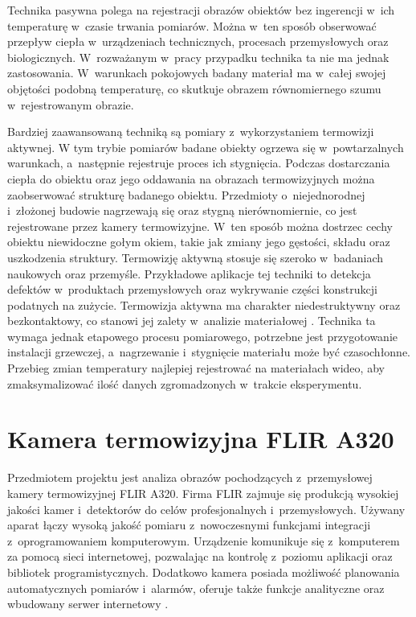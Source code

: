 Technika pasywna polega na rejestracji obrazów obiektów bez ingerencji w~ich
temperaturę w~czasie trwania pomiarów.
Można w~ten sposób obserwować przepływ ciepła w~urządzeniach technicznych,
procesach przemysłowych oraz biologicznych.
W~rozważanym w~pracy przypadku technika ta nie ma jednak zastosowania.
W~warunkach pokojowych badany materiał ma w~całej swojej objętości podobną
temperaturę, co skutkuje obrazem równomiernego szumu w~rejestrowanym obrazie.

Bardziej zaawansowaną techniką są pomiary z~wykorzystaniem termowizji aktywnej.
W tym trybie pomiarów badane obiekty ogrzewa się w~powtarzalnych warunkach,
a~następnie rejestruje proces ich stygnięcia.
Podczas dostarczania ciepła do obiektu oraz jego oddawania na obrazach
termowizyjnych można zaobserwować strukturę badanego obiektu.
Przedmioty o~niejednorodnej i~złożonej budowie nagrzewają się oraz stygną
nierównomiernie, co jest rejestrowane przez kamery termowizyjne.
W~ten sposób można dostrzec cechy obiektu niewidoczne gołym okiem, takie jak 
zmiany jego gęstości, składu oraz uszkodzenia struktury.
Termowizję aktywną stosuje się szeroko w~badaniach naukowych oraz przemyśle.
Przykładowe aplikacje tej techniki to detekcja defektów w~produktach
przemysłowych oraz wykrywanie części konstrukcji podatnych na zużycie.
Termowizja aktywna ma charakter niedestruktywny oraz bezkontaktowy, co stanowi
jej zalety w~analizie materiałowej \cite{ciampa_thermography}.
Technika ta wymaga jednak etapowego procesu pomiarowego, potrzebne jest
przygotowanie instalacji grzewczej, a~nagrzewanie i~stygnięcie materiału może
być czasochłonne.
Przebieg zmian temperatury najlepiej rejestrować na materiałach wideo, aby
zmaksymalizować ilość danych zgromadzonych w~trakcie eksperymentu.

\section{Kamera termowizyjna FLIR A320}
\label{sec:camera}
Przedmiotem projektu jest analiza obrazów pochodzących z~przemysłowej kamery
termowizyjnej FLIR A320.
Firma FLIR zajmuje się produkcją wysokiej jakości kamer i~detektorów do celów
profesjonalnych i~przemysłowych.
Używany aparat łączy wysoką jakość pomiaru z~nowoczesnymi funkcjami integracji
z~oprogramowaniem komputerowym.
Urządzenie komunikuje się z~komputerem za pomocą sieci internetowej, pozwalając
na kontrolę z~poziomu aplikacji oraz bibliotek programistycznych.
Dodatkowo kamera posiada możliwość planowania automatycznych pomiarów i~alarmów,
oferuje także funkcje analityczne oraz wbudowany serwer internetowy
\cite{flir_a32x_manual}.

